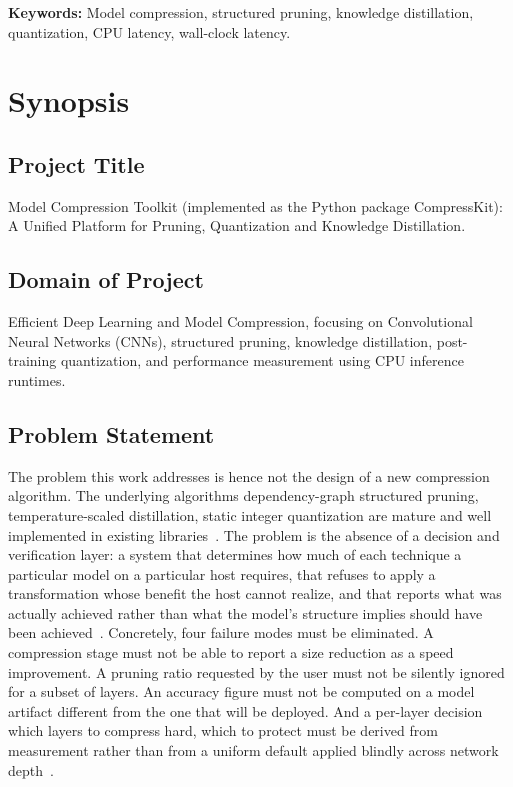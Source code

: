 \documentclass[oneside,a4paper,12pt]{report}
\begin{document}
\vspace{0.4cm}
\textbf{Keywords:} Model compression, structured pruning,  knowledge distillation, quantization, CPU latency, wall-clock latency.






\newpage
 \tableofcontents
 \newpage
 \listoffigures
 \newpage
 \listoftables


\chapter{Synopsis}

\section{Project Title}

Model Compression Toolkit (implemented as the Python package CompressKit): A Unified Platform for Pruning, Quantization and Knowledge Distillation.



\section{Domain of Project}  

Efficient Deep Learning and Model Compression, focusing on Convolutional Neural Networks (CNNs), structured pruning, knowledge distillation, post-training quantization, and performance measurement using CPU inference runtimes.


\section{Problem Statement}
The problem this work addresses is hence not the design of a new compression algorithm. The underlying algorithms dependency-graph structured pruning, temperature-scaled distillation, static integer quantization are mature and well implemented in existing libraries~\cite{wang2025,hinton2015}. The problem is the absence of a decision and verification layer: a system that determines how much of each technique a particular model on a particular host requires, that refuses to apply a transformation whose benefit the host cannot realize, and that reports what was actually achieved rather than what the model's structure implies should have been achieved~\cite{chae2026,abdelsalam2025}. Concretely, four failure modes must be eliminated. A compression stage must not be able to report a size reduction as a speed improvement. A pruning ratio requested by the user must not be silently ignored for a subset of layers. An accuracy figure must not be computed on a model artifact different from the one that will be deployed. And a per-layer decision which layers to compress hard, which to protect must be derived from measurement rather than from a uniform default applied blindly across network depth~\cite{khan2025}.
\end{document}
